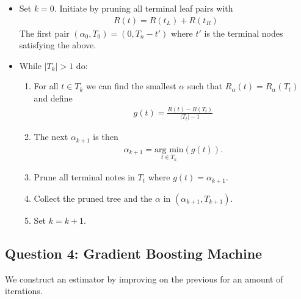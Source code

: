 \documentclass[a4paper,12pt,openany]{book}
\providecommand{\tightlist}{%
 \setlength{\itemsep}{0pt}\setlength{\parskip}{0pt}}
\begin{document}
\begin{itemize}
\tightlist
\item
  Set \(k=0\). Initiate by pruning all terminal leaf pairs with
  \begin{align*}
    R(t)=R(t_L)+R(t_R)
    \end{align*}
  The first pair \((\alpha_0,T_0)=(0,T_n-t')\) where \(t'\) is the terminal nodes satisfying the above.
\item
  While \(\vert T_k\vert >1\) do:

  \begin{enumerate}
  \def\labelenumi{(\alph{enumi})}
  \tightlist
  \item
    For all \(t\in T_k\) we can find the smallest \(\alpha\) such that \(R_\alpha(t)=R_\alpha(T_t)\) and define
    \begin{align*}
    g(t)=\frac{R(t)-R(T_t)}{\vert T_t\vert -1}
    \end{align*}
  \item
    The next \(\alpha_{k+1}\) is then
    \begin{align*}
    \alpha_{k+1}=\underset{t\in T_k}{\text{arg min}}(g(t)).
    \end{align*}
  \item
    Prune all terminal notes in \(T_t\) where \(g(t)=\alpha_{k+1}\).
  \item
    Collect the pruned tree and the \(\alpha\) in \((\alpha_{k+1},T_{k+1})\).
  \item
    Set \(k=k+1\).
  \end{enumerate}
\end{itemize}

\hypertarget{question-4-gradient-boosting-machine}{%
\subsection{Question 4: Gradient Boosting Machine}\label{question-4-gradient-boosting-machine}}

We construct an estimator by improving on the previous for an amount of iterations.
\end{document}
